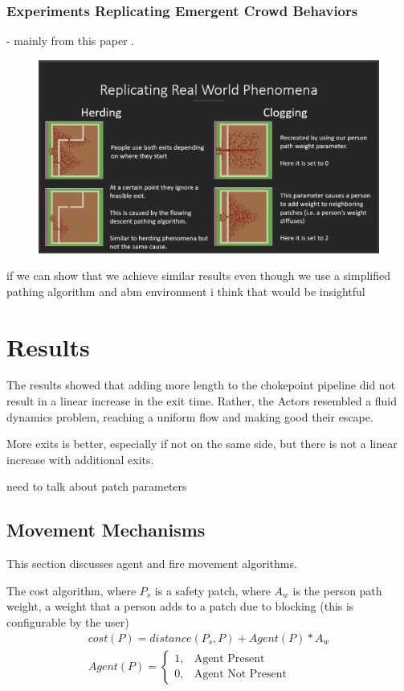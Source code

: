 \documentclass[12pt,letterpaper]{article}
\begin{document}
\subsubsection{Experiments Replicating Emergent Crowd Behaviors}
- mainly from this paper \cite{almeidaCrowdSimulationModeling2013}  .  

\begin{figure}
  \includegraphics[width=\linewidth]{./figures/herding_clogging.png}
  \caption{}
\end{figure}


if we can show that we achieve similar results even though we use a simplified pathing algorithm and abm environment i think that would be insightful


\section{Results}

The results showed that adding more length to the chokepoint pipeline did not
result in a linear increase in the exit time. Rather, the Actors resembled a
fluid dynamics problem, reaching a uniform flow and making good their escape.

More exits is better, especially if not on the same side, but there is not a
linear increase with additional exits.



need to talk about patch parameters
\subsection{Movement Mechanisms}
This section discusses agent and fire movement algorithms.

The cost algorithm, where $P_s$ is a safety patch, where $A_w$ is the person path weight, a weight that a person adds to a patch due to blocking (this is configurable by the user)
\begin{align}
cost(P)  = distance(P_s, P) + Agent(P) * A_w \nonumber \\
Agent(P)=
\begin{cases}
1, & \text{Agent Present}  \\
0, & \text{Agent Not Present} 
\end{cases}
\end{align}
\end{document}
